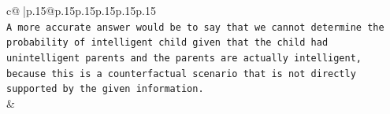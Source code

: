 \documentclass{article}
\begin{document}
{\begin{supertabular}{c@{$\;$}|p{.15\linewidth}@{}p{.15\linewidth}p{.15\linewidth}p{.15\linewidth}p{.15\linewidth}p{.15\linewidth}}
{{{\\ 
\texttt{A more accurate answer would be to say that we cannot determine the probability of intelligent child given that the child had unintelligent parents and the parents are actually intelligent, because this is a counterfactual scenario that is not directly supported by the given information.} \\
            }
        }
    }
    & \\ \\

\end{supertabular}
}
\end{document}
